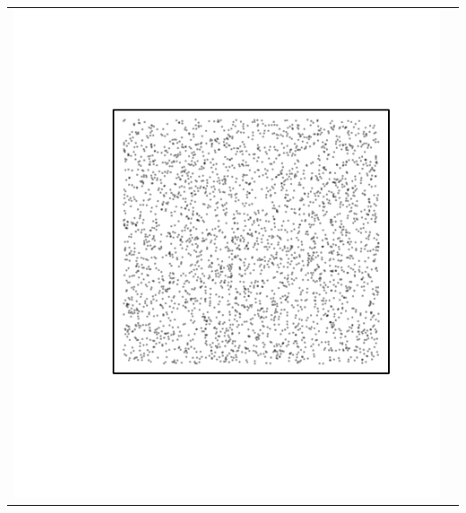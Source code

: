 \documentclass{article}\usepackage{graphicx, color}
\makeatletter
\def\maxwidth{ %
  \ifdim\Gin@nat@width>\linewidth
    \linewidth
  \else
    \Gin@nat@width
  \fi
}
\newenvironment{knitrout}{}{} %
\makeatother
\begin{document}
\vspace*{-1.75in}
\begin{tabular}{cc}
\begin{knitrout}
\definecolor{shadecolor}{rgb}{0.969, 0.969, 0.969}\color{fgcolor}\includegraphics[width=\maxwidth]{figure/unnamed-chunk-27} 
\end{knitrout}


\end{tabular}
\end{document}
